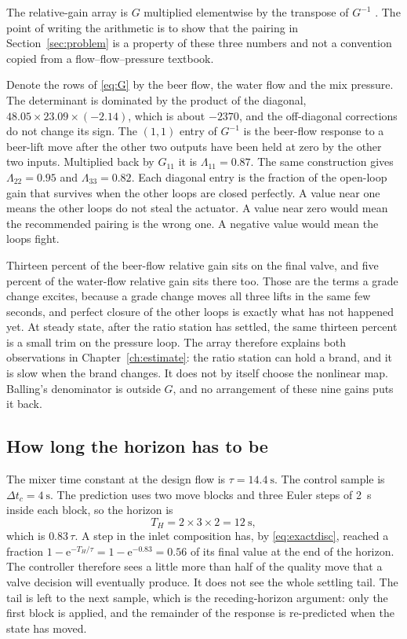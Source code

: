 The relative-gain array is $G$ multiplied elementwise by the transpose of $G^{-1}$ \citep{bristol1966}. The point of writing the arithmetic is to show that the pairing in Section~\ref{sec:problem} is a property of these three numbers and not a convention copied from a flow--flow--pressure textbook.

Denote the rows of \eqref{eq:G} by the beer flow, the water flow and the mix pressure. The determinant is dominated by the product of the diagonal, $48.05\times 23.09\times(-2.14)$, which is about $-2370$, and the off-diagonal corrections do not change its sign. The $(1,1)$ entry of $G^{-1}$ is the beer-flow response to a beer-lift move after the other two outputs have been held at zero by the other two inputs. Multiplied back by $G_{11}$ it is $\Lambda_{11}=0.87$. The same construction gives $\Lambda_{22}=0.95$ and $\Lambda_{33}=0.82$. Each diagonal entry is the fraction of the open-loop gain that survives when the other loops are closed perfectly. A value near one means the other loops do not steal the actuator. A value near zero would mean the recommended pairing is the wrong one. A negative value would mean the loops fight.

Thirteen percent of the beer-flow relative gain sits on the final valve, and five percent of the water-flow relative gain sits there too. Those are the terms a grade change excites, because a grade change moves all three lifts in the same few seconds, and perfect closure of the other loops is exactly what has not happened yet. At steady state, after the ratio station has settled, the same thirteen percent is a small trim on the pressure loop. The array therefore explains both observations in Chapter~\ref{ch:estimate}: the ratio station can hold a brand, and it is slow when the brand changes. It does not by itself choose the nonlinear map. Balling's denominator is outside $G$, and no arrangement of these nine gains puts it back.

\subsection{How long the horizon has to be}
\label{sec:horizon}

The mixer time constant at the design flow is $\tau=\SI{14.4}{\second}$. The control sample is $\Delta t_c=\SI{4}{\second}$. The prediction uses two move blocks and three Euler steps of \SI{2}{\second} inside each block, so the horizon is
\begin{equation}
T_H = 2\times 3\times 2 = \SI{12}{\second},
\end{equation}
which is $0.83\,\tau$. A step in the inlet composition has, by \eqref{eq:exactdisc}, reached a fraction $1-\mathrm{e}^{-T_H/\tau}=1-\mathrm{e}^{-0.83}=0.56$ of its final value at the end of the horizon. The controller therefore sees a little more than half of the quality move that a valve decision will eventually produce. It does not see the whole settling tail. The tail is left to the next sample, which is the receding-horizon argument: only the first block is applied, and the remainder of the response is re-predicted when the state has moved.

